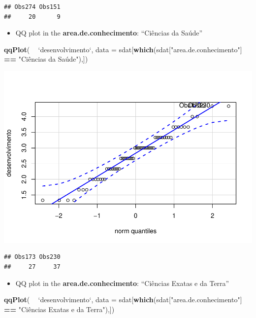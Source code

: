 \documentclass[]{article}
\newenvironment{Shaded}{\begin{snugshade}}{\end{snugshade}}
\newcommand{\DataTypeTok}[1]{\textcolor[rgb]{0.13,0.29,0.53}{#1}}
\newcommand{\KeywordTok}[1]{\textcolor[rgb]{0.13,0.29,0.53}{\textbf{#1}}}
\newcommand{\NormalTok}[1]{#1}
\newcommand{\OperatorTok}[1]{\textcolor[rgb]{0.81,0.36,0.00}{\textbf{#1}}}
\newcommand{\StringTok}[1]{\textcolor[rgb]{0.31,0.60,0.02}{#1}}
\providecommand{\tightlist}{%
  \setlength{\itemsep}{0pt}\setlength{\parskip}{0pt}}
\begin{document}
\begin{verbatim}
## Obs274 Obs151 
##     20      9
\end{verbatim}

\begin{itemize}
\tightlist
\item
  QQ plot in the \textbf{area.de.conhecimento}: ``Ciências da Saúde''
\end{itemize}

\begin{Shaded}
\begin{Highlighting}[]
\KeywordTok{qqPlot}\NormalTok{( }\OperatorTok{~}\StringTok{ `}\DataTypeTok{desenvolvimento}\StringTok{`}\NormalTok{, }\DataTypeTok{data =}\NormalTok{ sdat[}\KeywordTok{which}\NormalTok{(sdat[}\StringTok{"area.de.conhecimento"}\NormalTok{] }\OperatorTok{==}\StringTok{ "Ciências da Saúde"),])}
\end{Highlighting}
\end{Shaded}

\includegraphics{factorialAnova_files/figure-latex/unnamed-chunk-24-1.pdf}

\begin{verbatim}
## Obs173 Obs230 
##     27     37
\end{verbatim}

\begin{itemize}
\tightlist
\item
  QQ plot in the \textbf{area.de.conhecimento}: ``Ciências Exatas e da
  Terra''
\end{itemize}

\begin{Shaded}
\begin{Highlighting}[]
\KeywordTok{qqPlot}\NormalTok{( }\OperatorTok{~}\StringTok{ `}\DataTypeTok{desenvolvimento}\StringTok{`}\NormalTok{, }\DataTypeTok{data =}\NormalTok{ sdat[}\KeywordTok{which}\NormalTok{(sdat[}\StringTok{"area.de.conhecimento"}\NormalTok{] }\OperatorTok{==}\StringTok{ "Ciências Exatas e da Terra"}\NormalTok{),])}
\end{Highlighting}
\end{Shaded}
\end{document}
